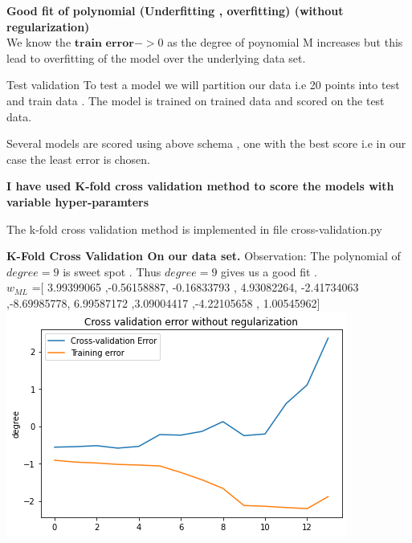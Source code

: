 \documentclass[11pt]{beamer}
\begin{document}
\begin{frame}
\textbf{Good fit of polynomial (Underfitting , overfitting) (without regularization)}\\
We know the  $\textbf{train error} -> 0$ as the degree of poynomial M increases but this lead to overfitting of the model over the underlying data set.

Test validation 
To test a model we will partition our data i.e 20 points into test and train data . The model is trained on trained data and scored on the test data. 

Several models are scored using above schema , one with the best score i.e in our case the least error is chosen.

\textbf{I have used K-fold cross validation method to score the models with variable hyper-paramters}

The k-fold cross validation method is implemented in file cross-validation.py
\end{frame}



\begin{frame}
\textbf{K-Fold Cross Validation On our data set. }
Observation: The polynomial of $degree=9$ is sweet spot . Thus $degree=9$ gives us a good fit .\\
$w_{ML}$ =[ 3.99399065 ,-0.56158887, -0.16833793 , 4.93082264, -2.41734063 ,-8.69985778,
  6.99587172  ,3.09004417 ,-4.22105658 , 1.00545962]
  \\
\includegraphics[scale=0.40]{images/9.png}
\end{frame}
\end{document}
